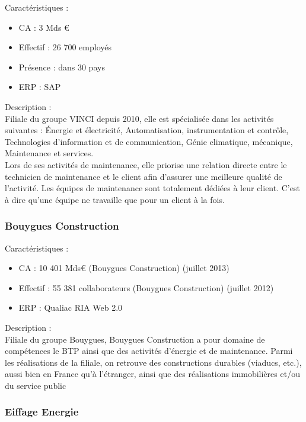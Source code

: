 Caractéristiques : \\

\begin{itemize}
    \item CA : 3 Mds €
    \item Effectif : 26 700 employés
    \item Présence : dans 30 pays
    \item ERP : SAP
\end{itemize}

Description : \\

Filiale du groupe VINCI depuis 2010, elle est spécialisée dans les activités suivantes : Énergie et électricité, Automatisation, instrumentation et contrôle, Technologies d’information et de communication, Génie climatique, mécanique, Maintenance et services. \\

Lors de ses activités de maintenance, elle priorise une relation directe entre le technicien de maintenance et le client afin d’assurer une meilleure qualité de l’activité. Les équipes de maintenance sont totalement dédiées à leur client. C’est à dire qu’une équipe ne travaille que pour un client à la fois.

\subsubsection{Bouygues Construction}

Caractéristiques : \\

\begin{itemize}
    \item CA : 10 401 Mds€ (Bouygues Construction) (juillet 2013)
    \item Effectif : 55 381 collaborateurs (Bouygues Construction) (juillet 2012)
    \item ERP : Qualiac RIA Web 2.0
\end{itemize}

Description : \\

Filiale du groupe Bouygues, Bouygues Construction a pour domaine de compétences le BTP ainsi que des activités d’énergie et de maintenance. Parmi les réalisations de la filiale, on retrouve des constructions durables (viaducs, etc.), aussi bien en France qu’à l’étranger, ainsi que des réalisations immobilières et/ou du service public

\subsubsection{Eiffage Energie} \\

